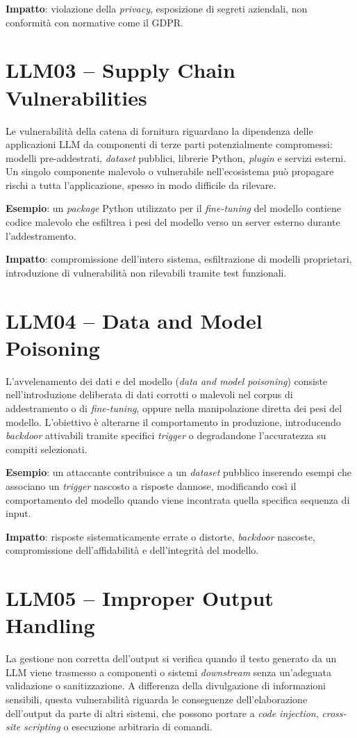 \textbf{Impatto}: violazione della \emph{privacy}, esposizione di segreti aziendali, non conformità con normative come il GDPR.

\section*{LLM03 -- Supply Chain Vulnerabilities}
Le vulnerabilità della catena di fornitura riguardano la dipendenza delle applicazioni LLM da componenti di terze parti potenzialmente compromessi: modelli pre-addestrati, \emph{dataset} pubblici, librerie Python, \emph{plugin} e servizi esterni. Un singolo componente malevolo o vulnerabile nell'ecosistema può propagare rischi a tutta l'applicazione, spesso in modo difficile da rilevare.

\textbf{Esempio}: un \emph{package} Python utilizzato per il \emph{fine-tuning} del modello contiene codice malevolo che esfiltrea i pesi del modello verso un server esterno durante l'addestramento.

\textbf{Impatto}: compromissione dell'intero sistema, esfiltrazione di modelli proprietari, introduzione di vulnerabilità non rilevabili tramite test funzionali.

\section*{LLM04 -- Data and Model Poisoning}
L'avvelenamento dei dati e del modello (\emph{data and model poisoning}) consiste nell'introduzione deliberata di dati corrotti o malevoli nel corpus di addestramento o di \emph{fine-tuning}, oppure nella manipolazione diretta dei pesi del modello. L'obiettivo è alterarne il comportamento in produzione, introducendo \emph{backdoor} attivabili tramite specifici \emph{trigger} o degradandone l'accuratezza su compiti selezionati.

\textbf{Esempio}: un attaccante contribuisce a un \emph{dataset} pubblico inserendo esempi che associano un \emph{trigger} nascosto a risposte dannose, modificando così il comportamento del modello quando viene incontrata quella specifica sequenza di input.

\textbf{Impatto}: risposte sistematicamente errate o distorte, \emph{backdoor} nascoste, compromissione dell'affidabilità e dell'integrità del modello.

\section*{LLM05 -- Improper Output Handling}
La gestione non corretta dell'output si verifica quando il testo generato da un LLM viene trasmesso a componenti o sistemi \emph{downstream} senza un'adeguata validazione o sanitizzazione. A differenza della divulgazione di informazioni sensibili, questa vulnerabilità riguarda le conseguenze dell'elaborazione dell'output da parte di altri sistemi, che possono portare a \emph{code injection}, \emph{cross-site scripting} o esecuzione arbitraria di comandi.

